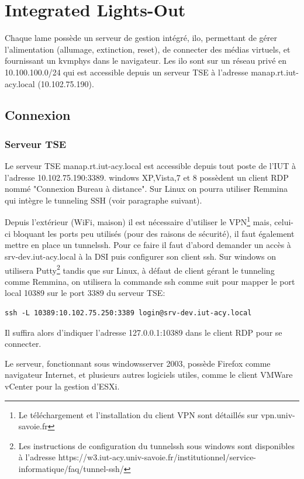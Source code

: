 \documentclass[a4paper,oneside]{report}
\begin{document}
\section{Integrated Lights-Out}
Chaque lame possède un serveur de gestion intégré, \gls{ilo}, permettant de gérer l'alimentation (allumage, extinction, reset), de connecter des médias virtuels, et fournissant un \gls{kvmphys} dans le navigateur.
Les \gls{ilo} sont sur un réseau privé en 10.100.100.0/24 qui est accessible depuis un serveur TSE à l'adresse manap.rt.iut-acy.local (10.102.75.190).

\subsection{Connexion}
\subsubsection{Serveur TSE}
Le serveur TSE manap.rt.iut-acy.local est accessible depuis tout poste de l'IUT à l'adresse 10.102.75.190:3389. \gls{windows} XP,Vista,7 et 8 possèdent un client RDP nommé "Connexion Bureau à distance". Sur Linux on pourra utiliser Remmina qui intègre le tunneling SSH (voir paragraphe suivant).


Depuis l'extérieur (WiFi, maison) il est nécessaire d'utiliser le VPN\footnote{Le téléchargement et l'installation du client VPN sont détaillés sur vpn.univ-savoie.fr} mais, celui-ci bloquant les ports peu utilisés (pour des raisons de sécurité), il faut également mettre en place un \gls{tunnelssh}.
Pour ce faire il faut d'abord demander un accès à srv-dev.iut-acy.local à la DSI puis configurer son client \gls{ssh}.\newline
Sur \gls{windows} on utilisera Putty\footnote{Les instructions de configuration du \gls{tunnelssh} sous \gls{windows} sont disponibles à l'adresse https://w3.iut-acy.univ-savoie.fr/institutionnel/service-informatique/faq/tunnel-ssh/} tandis que sur Linux, à défaut de client gérant le tunneling comme Remmina, on utilisera la commande ssh comme suit pour mapper le port local 10389 sur le port 3389 du serveur TSE:
\label{tunnelingSsh}
\begin{verbatim}
ssh -L 10389:10.102.75.250:3389 login@srv-dev.iut-acy.local
\end{verbatim}
Il suffira alors d'indiquer l'adresse 127.0.0.1:10389 dans le client RDP pour se connecter.

Le serveur, fonctionnant sous \gls{windowsserver} 2003, possède Firefox comme navigateur Internet, et plusieurs autres logiciels utiles, comme le client VMWare vCenter pour la gestion d'ESXi.
\end{document}
